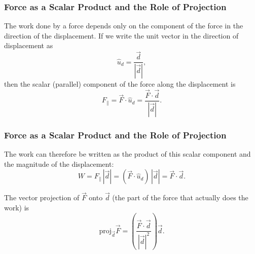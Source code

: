 \begin{frame}
\frametitle{Force as a Scalar Product and the Role of Projection}
The work done by a force depends only on the component of the force in the direction of the displacement. If we write the unit vector in the direction of displacement as
\[
\hat{u}_{d} = \frac{\vec{d}}{|\vec{d}|},
\]
then the scalar (parallel) component of the force along the displacement is
\[
F_{\parallel} = \vec{F}\cdot\hat{u}_{d} = \frac{\vec{F}\cdot\vec{d}}{|\vec{d}|}.
\]
\end{frame} 

\begin{frame} 
    \frametitle{Force as a Scalar Product and the Role of Projection}
The work can therefore be written as the product of this scalar component and the magnitude of the displacement:
\[
W = F_{\parallel}\,|\vec{d}| = (\vec{F}\cdot\hat{u}_{d})\,|\vec{d}| = \vec{F}\cdot\vec{d}.
\]

The vector projection of \(\vec{F}\) onto \(\vec{d}\) (the part of the force that actually does the work) is
\[
\mathrm{proj}_{\vec{d}}\vec{F} = \left(\frac{\vec{F}\cdot\vec{d}}{|\vec{d}|^{2}}\right)\vec{d}.
\]
\end{frame} 

